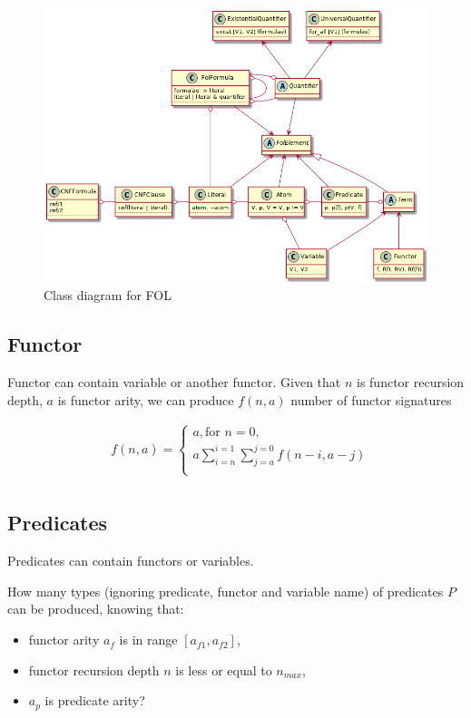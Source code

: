 \begin{figure}[H]
\begin{centering}
  \includegraphics[width=\textwidth]{logic-formula-generator/fol/fol_elements.png}
  \caption{Class diagram for FOL}
\end{centering}
\end{figure}

\subsection{Functor}

Functor can contain variable or another functor.
Given that
$n$ is functor recursion depth,
$a$ is functor arity,
we can produce $f(n, a)$ number of functor signatures

\begin{align*}
	&f(n, a) =
	\begin{cases}
		a, \text{for } n = 0, \\
		a \sum_{i=n}^{i=1} \sum_{j=a}^{j=0} f(n-i,a-j) \\
	\end{cases} \\
\end{align*}

\subsection{Predicates}

Predicates can contain functors or variables.

How many types (ignoring predicate, functor and variable name) of predicates $P$ can be produced, knowing that:
\begin{itemize}
	\item functor arity $a_f$ is in range $[a_{f1}, a_{f2}]$,
	\item functor recursion depth $n$ is less or equal to $n_{max}$,
	\item $a_p$ is predicate arity?
\end{itemize}

